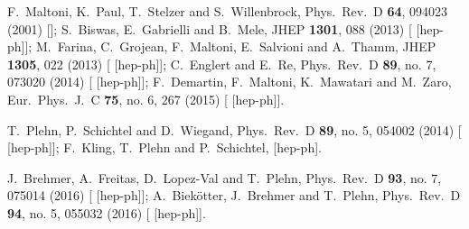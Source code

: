   F.~Maltoni, K.~Paul, T.~Stelzer and S.~Willenbrock,
  Phys.\ Rev.\ D {\bf 64}, 094023 (2001)
  [];
  S.~Biswas, E.~Gabrielli and B.~Mele,
  JHEP {\bf 1301}, 088 (2013)
  [ [hep-ph]];
  M.~Farina, C.~Grojean, F.~Maltoni, E.~Salvioni and A.~Thamm,
  JHEP {\bf 1305}, 022 (2013)
  [ [hep-ph]];
  C.~Englert and E.~Re,
  Phys.\ Rev.\ D {\bf 89}, no. 7, 073020 (2014)
  [ [hep-ph]];
  F.~Demartin, F.~Maltoni, K.~Mawatari and M.~Zaro,
  Eur.\ Phys.\ J.\ C {\bf 75}, no. 6, 267 (2015)
  [ [hep-ph]].

  T.~Plehn, P.~Schichtel and D.~Wiegand,
  Phys.\ Rev.\ D {\bf 89}, no. 5, 054002 (2014)
  [ [hep-ph]];
  F.~Kling, T.~Plehn and P.~Schichtel,
   [hep-ph].

  J.~Brehmer, A.~Freitas, D.~Lopez-Val and T.~Plehn,
  Phys.\ Rev.\ D {\bf 93}, no. 7, 075014 (2016)
  [ [hep-ph]];
  A.~Biek\"otter, J.~Brehmer and T.~Plehn,
  Phys.\ Rev.\ D {\bf 94}, no. 5, 055032 (2016)
  [ [hep-ph]].

